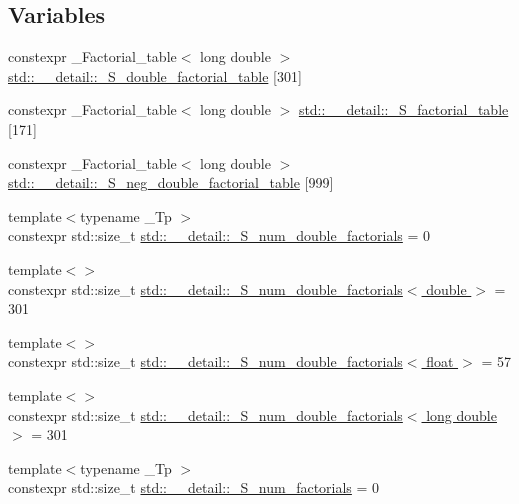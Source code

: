\subsection*{Variables}
\begin{DoxyCompactItemize}
\item 
constexpr \+\_\+\+Factorial\+\_\+table$<$ long double $>$ \hyperlink{namespacestd_1_1____detail_a6d1131fefdb30b2746c76ff801bdc833}{std\+::\+\_\+\+\_\+detail\+::\+\_\+\+S\+\_\+double\+\_\+factorial\+\_\+table} \mbox{[}301\mbox{]}
\item 
constexpr \+\_\+\+Factorial\+\_\+table$<$ long double $>$ \hyperlink{namespacestd_1_1____detail_a008b54abe31c1027aefdfd7a76a40e99}{std\+::\+\_\+\+\_\+detail\+::\+\_\+\+S\+\_\+factorial\+\_\+table} \mbox{[}171\mbox{]}
\item 
constexpr \+\_\+\+Factorial\+\_\+table$<$ long double $>$ \hyperlink{namespacestd_1_1____detail_adb3fbe0d6f7c40b02e479b63d547f57c}{std\+::\+\_\+\+\_\+detail\+::\+\_\+\+S\+\_\+neg\+\_\+double\+\_\+factorial\+\_\+table} \mbox{[}999\mbox{]}
\item 
{\footnotesize template$<$typename \+\_\+\+Tp $>$ }\\constexpr std\+::size\+\_\+t \hyperlink{namespacestd_1_1____detail_a762f5ed905d1f926bfd8b16f8ea2c568}{std\+::\+\_\+\+\_\+detail\+::\+\_\+\+S\+\_\+num\+\_\+double\+\_\+factorials} = 0
\item 
{\footnotesize template$<$$>$ }\\constexpr std\+::size\+\_\+t \hyperlink{namespacestd_1_1____detail_ae829eb6434a90060ee0650f1c71fb92d}{std\+::\+\_\+\+\_\+detail\+::\+\_\+\+S\+\_\+num\+\_\+double\+\_\+factorials$<$ double $>$} = 301
\item 
{\footnotesize template$<$$>$ }\\constexpr std\+::size\+\_\+t \hyperlink{namespacestd_1_1____detail_ac55fdd5d901fcd9335503b16ec897444}{std\+::\+\_\+\+\_\+detail\+::\+\_\+\+S\+\_\+num\+\_\+double\+\_\+factorials$<$ float $>$} = 57
\item 
{\footnotesize template$<$$>$ }\\constexpr std\+::size\+\_\+t \hyperlink{namespacestd_1_1____detail_a46272d8c219cfca2054da99471ed3711}{std\+::\+\_\+\+\_\+detail\+::\+\_\+\+S\+\_\+num\+\_\+double\+\_\+factorials$<$ long double $>$} = 301
\item 
{\footnotesize template$<$typename \+\_\+\+Tp $>$ }\\constexpr std\+::size\+\_\+t \hyperlink{namespacestd_1_1____detail_a671f3ba94c1b06be87992486bca37426}{std\+::\+\_\+\+\_\+detail\+::\+\_\+\+S\+\_\+num\+\_\+factorials} = 0

\end{DoxyCompactItemize}
